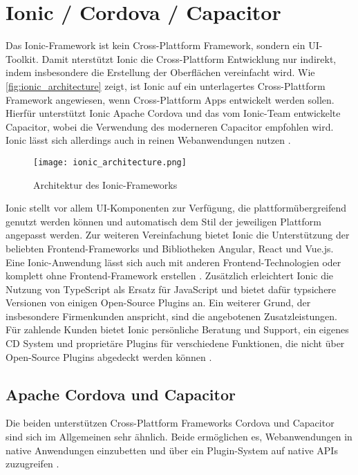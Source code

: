 

\section{Ionic / Cordova / Capacitor}
\label{sec:Frameworks_Ionic}

Das Ionic-Framework ist kein Cross-Plattform Framework, sondern ein UI-Toolkit.
Damit nterstützt Ionic die Cross-Plattform Entwicklung nur indirekt, indem insbesondere die Erstellung der Oberflächen vereinfacht wird.
Wie \autoref{fig:ionic_architecture} zeigt, ist Ionic auf ein unterlagertes Cross-Plattform Framework angewiesen, wenn Cross-Plattform Apps entwickelt werden sollen.
Hierfür unterstützt Ionic Apache Cordova und das vom Ionic-Team entwickelte Capacitor, wobei die Verwendung des moderneren Capacitor empfohlen wird.
Ionic lässt sich allerdings auch in reinen Webanwendungen nutzen \cite{Ionic_Docs}.
\begin{figure}[h]
    \centering
    \texttt{[image: ionic\_architecture.png]}
    \caption{Architektur des Ionic-Frameworks \cite{Ionic_Architektur}}
    \label{fig:ionic_architecture}
\end{figure}
Ionic stellt vor allem UI-Komponenten zur Verfügung, die plattformübergreifend genutzt werden können und automatisch dem Stil der jeweiligen Plattform angepasst werden.
Zur weiteren Vereinfachung bietet Ionic die Unterstützung der beliebten Frontend-Frameworks und Bibliotheken Angular, React und Vue.js.
Eine Ionic-Anwendung lässt sich auch mit anderen Frontend-Technologien oder komplett ohne Frontend-Framework erstellen \cite{Ionic_Docs, Ionic_EvaluationGuide}.
Zusätzlich erleichtert Ionic die Nutzung von TypeScript als Ersatz für JavaScript und bietet dafür typsichere Versionen von einigen Open-Source Plugins an. %
Ein weiterer Grund, der insbesondere Firmenkunden anspricht, sind die angebotenen Zusatzleistungen.
Für zahlende Kunden bietet Ionic persönliche Beratung und Support, ein eigenes \ac{CD} System und proprietäre Plugins für verschiedene Funktionen, die nicht über Open-Source Plugins abgedeckt werden können \cite{Ionic_EvaluationGuide}.


\subsection{Apache Cordova und Capacitor}
Die beiden unterstützen Cross-Plattform Frameworks Cordova und Capacitor sind sich im Allgemeinen sehr ähnlich.
Beide ermöglichen es, Webanwendungen in native Anwendungen einzubetten und über ein Plugin-System auf native \acp{API} zuzugreifen \cite{Ionic_Cordova_vs_Capacitor}.



